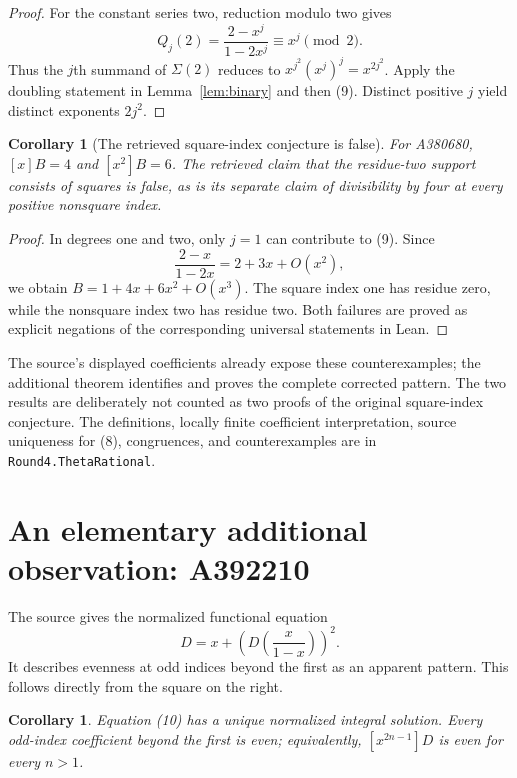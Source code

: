 \documentclass[11pt,a4paper]{article}
\newtheorem{corollary}[theorem]{Corollary}
\theoremstyle{remark}
\begin{document}
\begin{proof}
For the constant series two, reduction modulo two gives
\[
 Q_j(2)=\frac{2-x^j}{1-2x^j}\equiv x^j\pmod2.
\]
Thus the $j$th summand of $\Sigma(2)$ reduces to
$x^{j^2}(x^j)^j=x^{2j^2}$. Apply the doubling statement in
Lemma~\ref{lem:binary} and then (9). Distinct positive $j$ yield distinct
exponents $2j^2$.
\end{proof}

\begin{corollary}[The retrieved square-index conjecture is false]
For A380680, $[x]B=4$ and $[x^2]B=6$. The retrieved claim that the
residue-two support consists of squares is false, as is its separate
claim of divisibility by four at every positive nonsquare index.
\end{corollary}

\begin{proof}
In degrees one and two, only $j=1$ can contribute to (9). Since
\[
 \frac{2-x}{1-2x}=2+3x+O(x^2),
\]
we obtain $B=1+4x+6x^2+O(x^3)$. The square index one has residue zero,
while the nonsquare index two has residue two. Both failures are proved
as explicit negations of the corresponding universal statements in Lean.
\end{proof}

The source's displayed coefficients already expose these counterexamples;
the additional theorem identifies and proves the complete corrected
pattern. The two results are deliberately not counted as two proofs of
the original square-index conjecture. The definitions, locally finite
coefficient interpretation, source uniqueness for (8), congruences, and
counterexamples are in \texttt{Round4.ThetaRational}.

\section{An elementary additional observation: A392210}\label{sec:odd}

The source gives the normalized functional equation \cite{oeis210}
\[
 D=x+\left(D\!\left(\frac{x}{1-x}\right)\right)^2. \tag{10}
\]
It describes evenness at odd indices beyond the first as an apparent
pattern. This follows directly from the square on the right.

\begin{corollary}
Equation (10) has a unique normalized integral solution. Every
odd-index coefficient beyond the first is even; equivalently,
$[x^{2n-1}]D$ is even for every $n>1$.
\end{corollary}
\end{document}
